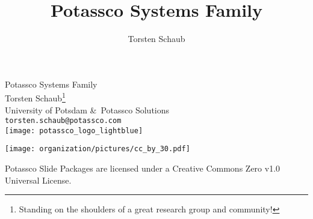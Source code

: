 \title{Potassco Systems Family}
\author{Torsten Schaub}
\begin{frame}[c]
  \bigskip
  \vfill
  \begin{center}%
    \alert{\huge {Potassco Systems Family}} %
    \bigskip
    \bigskip
    \\
    Torsten Schaub\footnote{Standing on the shoulders of a great research group and community!}\\
    University of Potsdam \&\ Potassco Solutions\\
    \texttt{torsten.schaub@potassco.com}\\
    \bigskip
    \texttt{[image: potassco\_logo\_lightblue]}
  \end{center}
  \bigskip
  \begin{center}
    \texttt{[image: organization/pictures/cc\_by\_30.pdf]} %
    \par
    {\tiny Potassco Slide Packages are licensed under a Creative Commons Zero v1.0 Universal License.}
  \end{center}
\end{frame}
%
